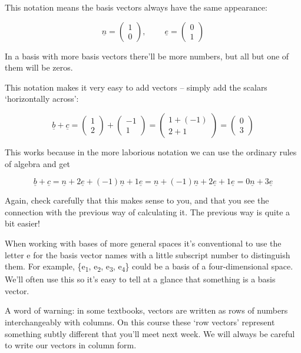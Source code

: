 \documentclass[oneside,english]{amsbook}
\numberwithin{section}{chapter}
\theoremstyle{plain}
\theoremstyle{definition}
\begin{document}
This notation means the basis vectors always have the same appearance:

\[\underline{n} = \begin{pmatrix}
	1 \\
	0
\end{pmatrix},\ \ \ \ \ \ \ \ \ \ \underline{e} = \begin{pmatrix}
	0 \\
	1
\end{pmatrix}\]

In a basis with more basis vectors there'll be more numbers, but all but
one of them will be zeros.

This notation makes it very easy to add vectors -- simply add the
scalars `horizontally across':

\[\underline{b} + \underline{c} = \begin{pmatrix}
	1 \\
	2
\end{pmatrix} + \begin{pmatrix}
	- 1 \\
	1
\end{pmatrix} = \begin{pmatrix}
	1 + ( - 1) \\
	2 + 1
\end{pmatrix} = \begin{pmatrix}
	0 \\
	3
\end{pmatrix}\]

This works because in the more laborious notation we can use the
ordinary rules of algebra and get

\[\underline{b} + \underline{c} = \underline{n} + 2\underline{e} + ( - 1)\underline{n} + 1\underline{e} = \underline{n} + ( - 1)\underline{n} + 2\underline{e} + 1\underline{e} = 0\underline{n} + 3\underline{e}\]

Again, check carefully that this makes sense to you, and that you see
the connection with the previous way of calculating it. The previous way
is quite a bit easier!

When working with bases of more general spaces it's conventional to use
the letter e for the basis vector names with a little subscript number
to distinguish them. For example, \{e\textsubscript{1},
e\textsubscript{2}, e\textsubscript{3}, e\textsubscript{4}\} could be a
basis of a four-dimensional space. We'll often use this so it's easy to
tell at a glance that something is a basis vector.

A word of warning: in some textbooks, vectors are written as rows of
numbers interchangeably with columns. On this course these `row
vectors' represent something subtly different that you'll meet next
week. We will always be careful to write our vectors in column form.
\end{document}
